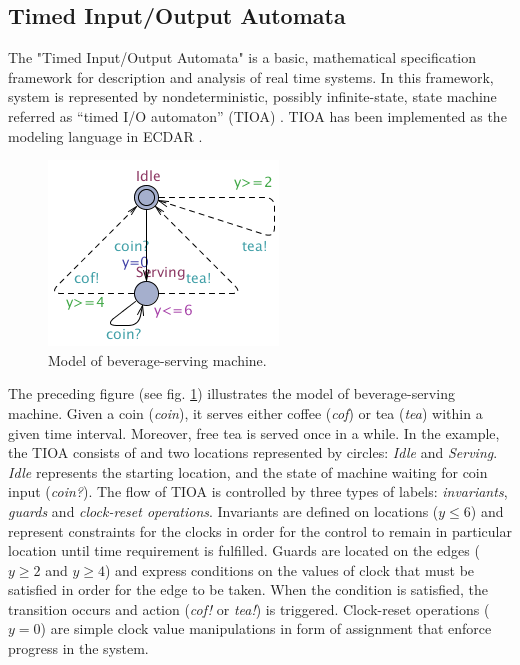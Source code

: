 


\subsection{Timed Input/Output Automata}
\label{background-tioa}
%
The "Timed Input/Output Automata" is a basic, mathematical specification
framework for description and analysis of real time systems.  In this framework,
system is represented by nondeterministic, possibly infinite-state, state
machine referred as “timed I/O automaton” (TIOA)
\cite{Kaynar:2006:TTI:1203437}. TIOA has been implemented as the modeling
language in ECDAR \cite{conf/atva/DavidLLNW10}.

\begin{figure}[t]
\label{simple-model}
\begin{centering}
\includegraphics[scale=0.7]{images/bev_machine_model}
\par\end{centering}
\caption{Model of beverage-serving machine.}
\label{bev-machine}
\end{figure}

The preceding figure (see fig. \ref{bev-machine}) illustrates the model of
beverage-serving machine. Given a coin (\emph{coin}), it serves either coffee
(\emph{cof}) or tea (\emph{tea}) within a given time interval. Moreover, free
tea is served once in a while. In the example, the TIOA consists of and two
locations represented by circles: \emph{Idle} and \emph{Serving}. \emph{Idle}
represents the starting location, and the state of machine waiting for coin
input (\emph{coin?}).  The flow of TIOA is controlled by three types of labels:
\emph{invariants}, \emph{guards} and \emph{clock-reset operations}.  Invariants
are defined on locations ($y\leq 6$) and represent constraints for the clocks in
order for the control to remain in particular location until time requirement is
fulfilled.  Guards are located on the edges ($y\geq 2$ and $y\geq 4$) and
express conditions on the values of clock that must be satisfied in order for
the edge to be taken. When the condition is satisfied, the transition occurs and
action (\emph{cof!} or \emph{tea!}) is triggered. Clock-reset operations ($y=0$)
are simple clock value manipulations in form of assignment that enforce progress
in the system.


